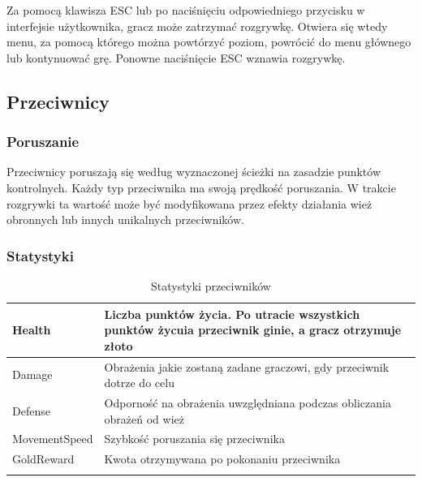 \documentclass[a4paper,12pt, twoside, titlepage]{article}
\begin{document}
Za pomocą klawisza ESC lub po naciśnięciu odpowiedniego przycisku w interfejsie użytkownika, gracz może zatrzymać rozgrywkę. Otwiera się wtedy menu, za pomocą którego można powtórzyć poziom, powrócić do menu głównego lub kontynuować grę. Ponowne naciśnięcie ESC wznawia rozgrywkę.


\subsection{Przeciwnicy}
\subsubsection{Poruszanie}
Przeciwnicy poruszają się według wyznaczonej ścieżki na zasadzie punktów kontrolnych. Każdy typ przeciwnika ma swoją prędkość poruszania. W trakcie rozgrywki ta wartość może być modyfikowana przez efekty działania wież obronnych lub innych unikalnych przeciwników.
\subsubsection{Statystyki}
\begin{center}
\begin{longtable}{| p{} | p{} |} 
	\hline
	Health
	& Liczba punktów życia. Po utracie wszystkich punktów życuia przeciwnik ginie, a gracz otrzymuje złoto \\
	\hline
	Damage
	& Obrażenia jakie zostaną zadane graczowi, gdy przeciwnik dotrze do celu \\ 
	\hline 
	Defense
	& Odporność na obrażenia uwzględniana podczas obliczania obrażeń od wież \\ 
	\hline
	MovementSpeed
	& Szybkość poruszania się przeciwnika \\ 
	\hline
	GoldReward
	& Kwota otrzymywana po pokonaniu przeciwnika \\ 
	\hline

	\caption{Statystyki przeciwników}	
\end{longtable}
\end{center}
\end{document}
